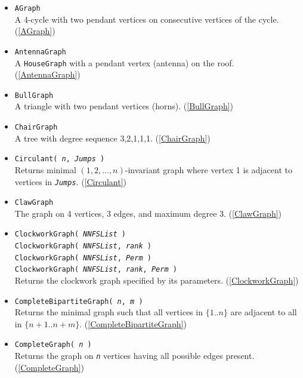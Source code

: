 \documentclass[a4paper,11pt]{report}
\begin{document}
{{\begin{itemize}
\item \texttt{AGraph}\\
 A 4-cycle with two pendant vertices on consecutive vertices of the cycle. (\ref{AGraph}) 
\item \texttt{AntennaGraph}\\
 A \texttt{HouseGraph} with a pendant vertex (antenna) on the roof. (\ref{AntennaGraph}) 
\item \texttt{BullGraph}\\
 A triangle with two pendant vertices (horns). (\ref{BullGraph}) 
\item \texttt{ChairGraph}\\
 A tree with degree sequence 3,2,1,1,1. (\ref{ChairGraph}) 
\item \texttt{Circulant( \mbox{\texttt{\mdseries\slshape n}}, \mbox{\texttt{\mdseries\slshape Jumps}} )}\\
 Returns minimal $(1, 2, ..., n)$-invariant graph where vertex 1 is adjacent to vertices in \mbox{\texttt{\mdseries\slshape Jumps}}. (\ref{Circulant}) 
\item \texttt{ClawGraph}\\
 The graph on 4 vertices, 3 edges, and maximum degree 3. (\ref{ClawGraph}) 
\item \texttt{ClockworkGraph( \mbox{\texttt{\mdseries\slshape NNFSList}} )}\\
 \texttt{ClockworkGraph( \mbox{\texttt{\mdseries\slshape NNFSList}}, \mbox{\texttt{\mdseries\slshape rank}} )}\\
 \texttt{ClockworkGraph( \mbox{\texttt{\mdseries\slshape NNFSList}}, \mbox{\texttt{\mdseries\slshape Perm}} )}\\
 \texttt{ClockworkGraph( \mbox{\texttt{\mdseries\slshape NNFSList}}, \mbox{\texttt{\mdseries\slshape rank}}, \mbox{\texttt{\mdseries\slshape Perm}} )}\\
 Returns the clockwork graph specified by its parameters. (\ref{ClockworkGraph}) 
\item \texttt{CompleteBipartiteGraph( \mbox{\texttt{\mdseries\slshape n}}, \mbox{\texttt{\mdseries\slshape m}} )}\\
 Returns the minimal graph such that all vertices in $\{1..n\}$ are adjacent to all in $\{n+1..n+m\}$. (\ref{CompleteBipartiteGraph}) 
\item \texttt{CompleteGraph( \mbox{\texttt{\mdseries\slshape n}} )}\\
 Returns the graph on \mbox{\texttt{\mdseries\slshape n}} vertices having all possible edges present. (\ref{CompleteGraph}) 

\end{itemize}}}
\end{document}
